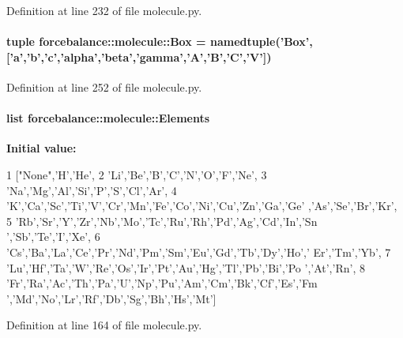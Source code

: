 \-Definition at line 232 of file molecule.\-py.

\hypertarget{namespaceforcebalance_1_1molecule_aa9de7b4fcb815b9f7ad490d461131e72}{
\paragraph[{\-Box}]{\setlength{\rightskip}{0pt plus 5cm}tuple {\bf forcebalance\-::molecule\-::\-Box} = namedtuple('{\bf \-Box}',\mbox{[}'a','b','c','alpha','beta','gamma','\-A','\-B','\-C','\-V'\mbox{]})}}\label{namespaceforcebalance_1_1molecule_aa9de7b4fcb815b9f7ad490d461131e72}


\-Definition at line 252 of file molecule.\-py.

\hypertarget{namespaceforcebalance_1_1molecule_af1987e9e7f33b828c15f1e4f7dcded2c}{
\paragraph[{\-Elements}]{\setlength{\rightskip}{0pt plus 5cm}list {\bf forcebalance\-::molecule\-::\-Elements}}}\label{namespaceforcebalance_1_1molecule_af1987e9e7f33b828c15f1e4f7dcded2c}
{\bfseries \-Initial value\-:}
\begin{DoxyCode}
1 ["None",'H','He',
2             'Li','Be','B','C','N','O','F','Ne',
3             'Na','Mg','Al','Si','P','S','Cl','Ar',
4             'K','Ca','Sc','Ti','V','Cr','Mn','Fe','Co','Ni','Cu','Zn','Ga','Ge'
      ,'As','Se','Br','Kr',
5             'Rb','Sr','Y','Zr','Nb','Mo','Tc','Ru','Rh','Pd','Ag','Cd','In','Sn
      ','Sb','Te','I','Xe',
6             'Cs','Ba','La','Ce','Pr','Nd','Pm','Sm','Eu','Gd','Tb','Dy','Ho','
      Er','Tm','Yb',
7             'Lu','Hf','Ta','W','Re','Os','Ir','Pt','Au','Hg','Tl','Pb','Bi','Po
      ','At','Rn',
8             'Fr','Ra','Ac','Th','Pa','U','Np','Pu','Am','Cm','Bk','Cf','Es','Fm
      ','Md','No','Lr','Rf','Db','Sg','Bh','Hs','Mt']
\end{DoxyCode}


\-Definition at line 164 of file molecule.\-py.

